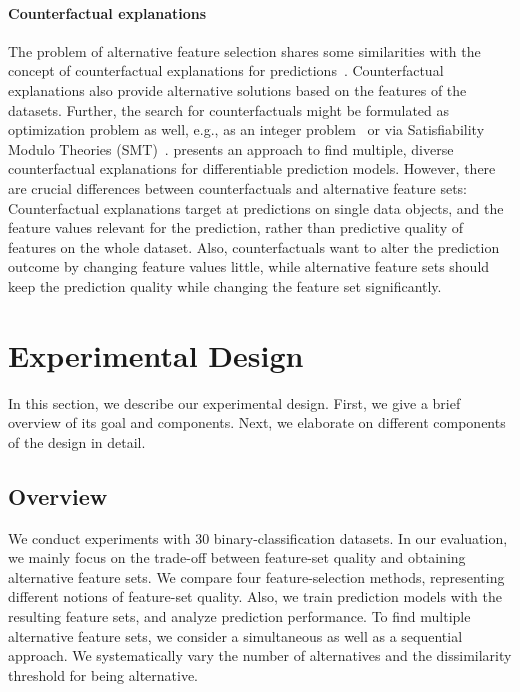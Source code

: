 \documentclass[conference]{IEEEtran}
\theoremstyle{definition}
\begin{document}
\paragraph{Counterfactual explanations}

The problem of alternative feature selection shares some similarities with the concept of counterfactual explanations for predictions~\cite{verma2020counterfactual, stepin2021survey}.
Counterfactual explanations also provide alternative solutions based on the features of the datasets.
Further, the search for counterfactuals might be formulated as optimization problem as well, e.g., as an integer problem~\cite{mohammadi2021scaling} or via Satisfiability Modulo Theories (SMT)~\cite{karimi2020model}.
\cite{mothilal2020explaining} presents an approach to find multiple, diverse counterfactual explanations for differentiable prediction models.
However, there are crucial differences between counterfactuals and alternative feature sets:
Counterfactual explanations target at predictions on single data objects, and the feature values relevant for the prediction, rather than predictive quality of features on the whole dataset.
Also, counterfactuals want to alter the prediction outcome by changing feature values little, while alternative feature sets should keep the prediction quality while changing the feature set significantly.

\section{Experimental Design}
\label{sec:experimental-design}

In this section, we describe our experimental design.
First, we give a brief overview of its goal and components.
Next, we elaborate on different components of the design in detail.

\subsection{Overview}
\label{sec:experimental-design:overview}

We conduct experiments with 30 binary-classification datasets.
In our evaluation, we mainly focus on the trade-off between feature-set quality and obtaining alternative feature sets.
We compare four feature-selection methods, representing different notions of feature-set quality.
Also, we train prediction models with the resulting feature sets, and analyze prediction performance.
To find multiple alternative feature sets, we consider a simultaneous as well as a sequential approach.
We systematically vary the number of alternatives and the dissimilarity threshold for being alternative.
\end{document}
